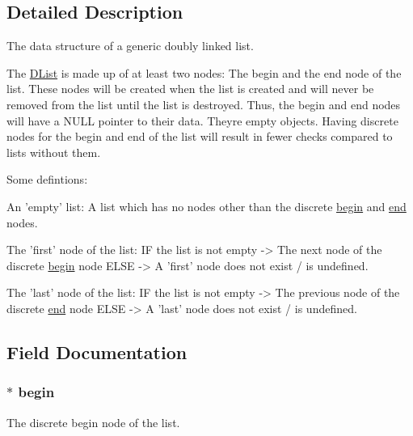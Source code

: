 \subsection{Detailed Description}
The data structure of a generic doubly linked list. 

The \hyperlink{struct_d_list}{D\+List} is made up of at least two nodes\+: The begin and the end node of the list. These nodes will be created when the list is created and will never be removed from the list until the list is destroyed. Thus, the begin and end nodes will have a N\+U\+LL pointer to their data. They\textquotesingle{}re empty objects. Having discrete nodes for the begin and end of the list will result in fewer checks compared to lists without them.

Some defintions\+: 
\begin{DoxyCode}
An \textcolor{stringliteral}{'empty'} list:
    A list which has no nodes other than the discrete \hyperlink{struct_d_list_a24466a201cee258a771ae5d105cde8c1}{begin} and \hyperlink{struct_d_list_acc55bec99edaf859fc9591ec29b4a46e}{end} nodes.

The \textcolor{stringliteral}{'first'} node of the list:
    IF the list is not empty    -> The next node of the discrete \hyperlink{struct_d_list_a24466a201cee258a771ae5d105cde8c1}{begin} node
    ELSE                        -> A \textcolor{stringliteral}{'first'} node does not exist / is undefined.

The \textcolor{stringliteral}{'last'} node of the list:
    IF the list is not empty    -> The previous node of the discrete \hyperlink{struct_d_list_acc55bec99edaf859fc9591ec29b4a46e}{end} node
    ELSE                        -> A \textcolor{stringliteral}{'last'} node does not exist / is undefined.
\end{DoxyCode}
 

\subsection{Field Documentation}
\subsubsection[{\texorpdfstring{begin}{begin}}]{$\ast$ begin}\hypertarget{struct_d_list_a24466a201cee258a771ae5d105cde8c1}{}\label{struct_d_list_a24466a201cee258a771ae5d105cde8c1}
The discrete begin node of the list. 
